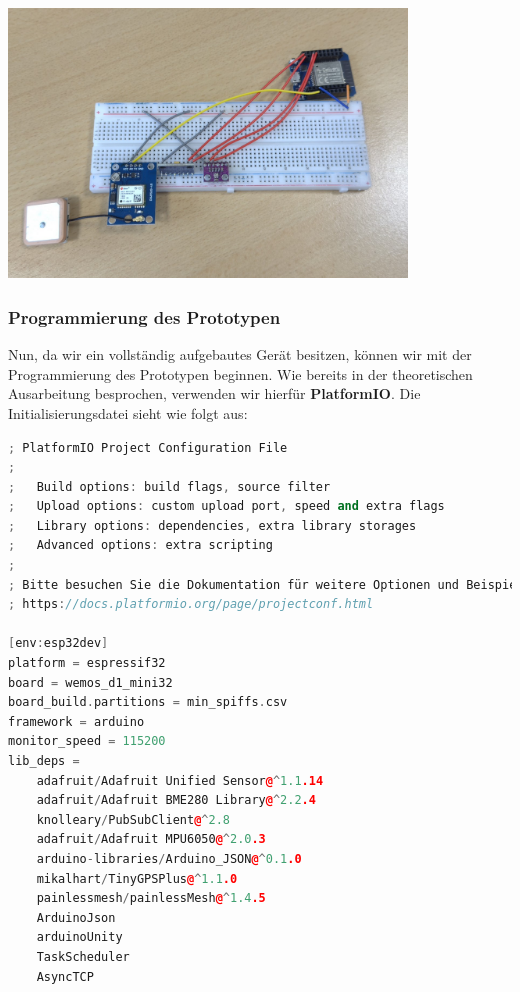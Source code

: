 \documentclass[
    headings=optiontotocandhead,%
    twoside,
    numbers=noenddot,%
    12pt, %
    titlepage, %
    parskip=full, %
    listof=leveldown, 
    numbers=noenddot, %
    a4paper,DIV=14,
    BCOR=15mm,
]{scrbook}
\let\origfigure=\figure
\let\endorigfigure=\endfigure
\renewenvironment{figure}[1][]{%
   \origfigure[H]
}{%
   \endorigfigure
}
\begin{document}
\begin{figure}
\centering
\includegraphics[width=4.16667in,height=\textheight]{img/Kampl/Breadboard-Aufbau.jpg}
\caption{Endprodukt}
\end{figure}

\hypertarget{programmierung-des-prototypen}{%
\subsubsection{Programmierung des
Prototypen}\label{programmierung-des-prototypen}}

Nun, da wir ein vollständig aufgebautes Gerät besitzen, können wir mit
der Programmierung des Prototypen beginnen. Wie bereits in der
theoretischen Ausarbeitung besprochen, verwenden wir hierfür
\textbf{PlatformIO}. Die Initialisierungsdatei sieht wie folgt aus:

\begin{lstlisting}[language={C++}]
; PlatformIO Project Configuration File
;
;   Build options: build flags, source filter
;   Upload options: custom upload port, speed and extra flags
;   Library options: dependencies, extra library storages
;   Advanced options: extra scripting
;
; Bitte besuchen Sie die Dokumentation für weitere Optionen und Beispiele:
; https://docs.platformio.org/page/projectconf.html

[env:esp32dev]
platform = espressif32
board = wemos_d1_mini32
board_build.partitions = min_spiffs.csv
framework = arduino
monitor_speed = 115200
lib_deps = 
    adafruit/Adafruit Unified Sensor@^1.1.14
    adafruit/Adafruit BME280 Library@^2.2.4
    knolleary/PubSubClient@^2.8
    adafruit/Adafruit MPU6050@^2.0.3
    arduino-libraries/Arduino_JSON@^0.1.0
    mikalhart/TinyGPSPlus@^1.1.0
    painlessmesh/painlessMesh@^1.4.5
    ArduinoJson
    arduinoUnity
    TaskScheduler
    AsyncTCP
\end{lstlisting}
\end{document}
